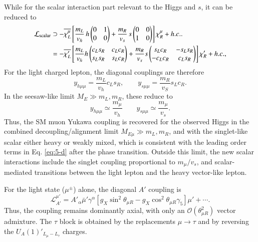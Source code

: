 \documentclass[onecolumn, aps, nofootinbib, prd, preprint, floats, floatfix, amsmath, amssymb, superscriptaddress, preprintnumbers]{revtex4-2}
\begin{document}
While for the scalar interaction part relevant to the Higgs and $s$, it can be reduced to
\begin{equation}
\begin{aligned}
\mathcal{L}_{\rm scalar} &
\supset-\overline{\chi_L^\mu}
\left[
\frac{m_L}{v_h}\,h
\begin{pmatrix}
0&1\\
0&0
\end{pmatrix}
+
\frac{m_R}{v_s}\,s
\begin{pmatrix}
0&0\\
1&0
\end{pmatrix}
\right]\chi_R^\mu
+h.c. .\\
&=-\overline{\chi'_L}
\left[\frac{m_L}{v_h} h \begin{pmatrix}
c_Ls_R&c_Lc_R\\
s_Ls_R&s_Lc_R
\end{pmatrix}+ \frac{m_R}{v_s} s \begin{pmatrix}
s_Lc_R&-s_Ls_R\\
-c_Lc_R&c_Ls_R
\end{pmatrix}\right]\chi'_R+h.c.,
\label{eq:gauge-basis-scalar-yukawa}
\end{aligned}
\end{equation}
For the light charged lepton, the diagonal couplings are therefore
\begin{equation}
y_{h\mu\mu}=
\frac{m_L}{v_h}c_Ls_R,
\qquad
y_{s\mu\mu}=\frac{m_R}{v_S}s_Lc_R .
\label{eq:light-scalar-yukawa}
\end{equation}
In the seesaw-like limit $M_E\gg m_L,m_R$, these reduce to
\begin{equation}
y_{h\mu\mu}\simeq
\frac{m_\mu}{v_h}
\qquad
y_{s\mu\mu}\simeq \frac{m_\mu}{v_s}.
\label{eq:sm-limit-scalar-yukawa}
\end{equation}
Thus, the SM muon Yukawa coupling is recovered for the observed Higgs in the combined decoupling/alignment limit $M_{E\mu}\gg m_L,m_R$, and with the singlet-like scalar either heavy or weakly mixed, which is consistent with the leading order terms in Eq. \eqref{eq:5-d} after the phase transition. Outside this limit, the new scalar interactions include the singlet coupling proportional to $m_\mu/v_s$, and scalar-mediated transitions between the light lepton and the heavy vector-like lepton.

For the light state ($\mu^\pm$) alone, the diagonal $A'$ coupling is
\begin{equation}
\mathcal{L}_{A'}^{\mu'}
=
A'_\alpha\bar\mu'\gamma^\alpha
\left[
g_X\sin^2\theta_{\mu R}
-g_X\cos^2\theta_{\mu R} \gamma_5
\right]\mu'
+\cdots .
\label{eq:light-muon-Apr}
\end{equation}
Thus, the coupling remains dominantly axial, with only an $\mathcal{O}(\theta_{\mu R}^2)$ vector admixture. The $\tau$ block is obtained by the replacements $\mu\to\tau$ and by reversing the $U_A(1)'_{L_\mu-L_\tau}$ charges.
\end{document}
